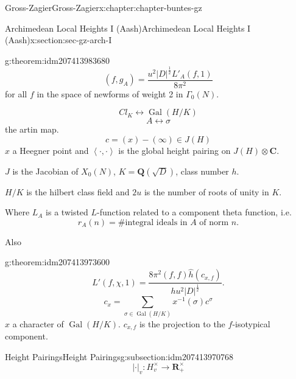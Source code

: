 \documentclass[oneside,10pt,]{book}
\numberwithin{equation}{section}
\newcommand{\inv}{^{-1}}
\newcommand{\pair}[2]{\left\langle #1, #2 \right\rangle}
\newcommand{\QQ}{\mathbf{Q}}
\newcommand{\RR}{\mathbf{R}}
\newcommand{\CC}{\mathbf{C}}
\newcommand{\Gal}[2]{\operatorname{Gal}(#1/#2)}
\begin{document}
\begin{chapterptx}{Gross-Zagier}{}{Gross-Zagier}{}{}{x:chapter:chapter-buntes-gz}
\begin{sectionptx}{Archimedean Local Heights I (Aash)}{}{Archimedean Local Heights I (Aash)}{}{}{x:section:sec-gz-arch-I}
\begin{introduction}{}
\begin{theorem}{}{}{g:theorem:idm207413983680}
\begin{equation*}
(f,g_A) = \frac{u^2 |D|^{\frac 12} L'_A(f,1)}{8\pi ^2}
\end{equation*}
for all \(f\) in the space of newforms of weight 2 in \(\Gamma _0(N)\).%
\end{theorem}
%
\begin{equation*}
Cl_K \leftrightarrow \Gal HK
\end{equation*}
%
\begin{equation*}
A \leftrightarrow \sigma 
\end{equation*}
the artin map.%
\begin{equation*}
c = (x) - (\infty ) \in J(H)
\end{equation*}
\(x\) a Heegner point and \(\pair \cdot\cdot\) is the global height pairing on \(J(H) \otimes \CC\).%
\par
\(J\) is the Jacobian of \(X_0(N)\), \(K = \QQ(\sqrt{D})\), class  number \(h\).%
\par
\(H/K\) is the hilbert class field and \(2u\) is the number of roots of unity in \(K\).%
\par
Where \(L_A\) is a twisted \(L\)-function related to a component theta function, i.e.%
\begin{equation*}
r_A(n) =\# \text{integral ideals in } A \text{ of norm }n\text{.}
\end{equation*}
%
\par
Also%
\begin{theorem}{}{}{g:theorem:idm207413973600}%
%
\begin{equation*}
L'(f,\chi ,1) = \frac{8\pi ^2 (f, f) \hat h(c_{x,f})}{hu^2 |D|^{\frac12}}\text{.}
\end{equation*}
%
\begin{equation*}
c_x = \sum_{\sigma \in \Gal HK} x\inv(\sigma ) c^\sigma 
\end{equation*}
\(x\) a character of \(\Gal HK\). \(c_{x,f}\) is the projection to the \(f\)-isotypical component.%
\end{theorem}
\end{introduction}%
%
%
\typeout{************************************************}
\typeout{************************************************}
%
\begin{subsectionptx}{Height Pairings}{}{Height Pairings}{}{}{g:subsection:idm207413970768}
%
\begin{equation*}
| \cdot |_v \colon  H_v^\times \to \RR_+^\times
\end{equation*}
%
\begin{equation*}

\end{equation*}
\end{subsectionptx}
\end{sectionptx}
\end{chapterptx}
\end{document}
